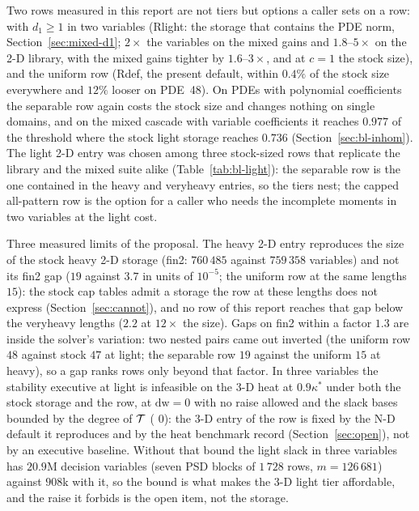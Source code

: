 Two rows measured in this report are not tiers but options a caller sets on a row:  with $d_1\ge1$ in two variables (Rlight: the storage that contains the PDE norm, Section~\ref{sec:mixed-d1}; $2\times$ the variables on the mixed gains and $1.8$--$5\times$ on the 2-D library, with the mixed gains tighter by $1.6$--$3\times$, and at $c=1$ the stock size), and the uniform row (Rdef, the present  default, within $0.4\%$ of the stock size everywhere and $12\%$ looser on PDE~48). On PDEs with polynomial coefficients the separable row again costs the stock size and changes nothing on single domains, and on the mixed cascade with variable coefficients it reaches $0.977$ of the threshold where the stock light storage reaches $0.736$ (Section~\ref{sec:bl-inhom}). The light 2-D entry was chosen among three stock-sized rows that replicate the library and the mixed suite alike (Table~\ref{tab:bl-light}): the separable row is the one contained in the heavy and veryheavy entries, so the tiers nest; the capped all-pattern row is the option for a caller who needs the incomplete moments in two variables at the light cost.

Three measured limits of the proposal. The heavy 2-D entry reproduces the size of the stock heavy 2-D storage (fin2: $760\,485$ against $759\,358$ variables) and not its fin2 gap ($19$ against $3.7$ in units of $10^{-5}$; the uniform row at the same lengths $15$): the stock cap tables admit a storage the row at these lengths does not express (Section~\ref{sec:cannot}), and no row of this report reaches that gap below the veryheavy lengths ($2.2$ at $12\times$ the size). Gaps on fin2 within a factor $1.3$ are inside the solver's variation: two nested pairs came out inverted (the uniform row $48$ against stock $47$ at light; the separable row $19$ against the uniform $15$ at heavy), so a gap ranks rows only beyond that factor. In three variables the stability executive at light is infeasible on the 3-D heat at $0.9\kappa^*$ under both the stock storage and the row, at $\mathrm{dw}=0$ with no raise allowed and the slack bases bounded by the degree of $\mathcal{T}$ ( $0$): the 3-D entry of the row is fixed by the N-D default it reproduces and by the heat benchmark record (Section~\ref{sec:open}), not by an executive baseline. Without that bound the light slack in three variables has $20.9$M decision variables (seven PSD blocks of $1\,728$ rows, $m=126\,681$) against $908$k with it, so the bound is what makes the 3-D light tier affordable, and the raise it forbids is the open item, not the storage.
